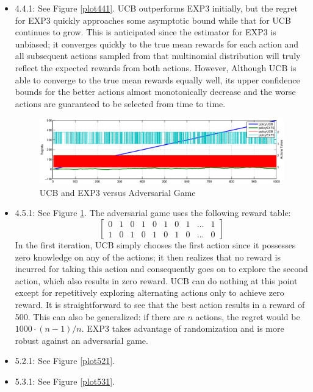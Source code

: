 \documentclass{article}
\begin{document}
\begin{itemize}
	\item 4.4.1: See Figure \ref{plot441}. UCB outperforms EXP3 initially, but the 
		regret for EXP3 quickly approaches some asymptotic bound while that for 
		UCB continues to grow. This is anticipated since the estimator for EXP3
		is unbiased; it converges quickly to the true mean rewards for each action
		and all subsequent actions sampled from that multinomial distribution will
		truly reflect the expected rewards from both actions. However, Although 
		UCB is able to converge to the true mean rewards equally well, its upper
		confidence bounds for the better actions almost monotonically decrease and the 
		worse actions are guaranteed to be selected from time to time. 
		
	\begin{figure}[h]
		\centering
		\includegraphics[width = \textwidth]{images/plot451.eps}
		\caption{UCB and EXP3 versus Adversarial Game}
		\label{plot451}
	\end{figure}	
	
	\item 4.5.1: See Figure \ref{plot451}. The adversarial game uses the following reward table:
	\begin{equation}
		\begin{bmatrix}0&1&0&1&0&1&0&1&\dots&1\\
		1&0&1&0&1&0&1&0&\dots&0\end{bmatrix}
	\end{equation}
	In the first iteration, UCB simply chooses the first action since it possesses zero
	knowledge on any of the actions; it then realizes that no reward is incurred for taking
	this action and consequently goes on to explore the second action, which also results
	in zero reward. UCB can do nothing at this point except for repetitively exploring
	alternating actions only to achieve zero reward. It is straightforward to see that
	the best action results in a reward of 500. This can also be generalized: if there
	are $n$ actions, the regret would be $1000\cdot (n-1)/n$. EXP3 takes advantage of 
	randomization and is more robust against an adversarial game. 
	
	\item 5.2.1: See Figure \ref{plot521}. 
	\item 5.3.1: See Figure \ref{plot531}.
	
\end{itemize}	
\end{document}
